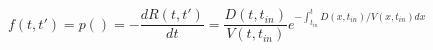 \begin{equation}
f(t,t') = p()= -\frac{dR(t,t')}{dt} = \frac{D(t,t_{in})}{V(t,t_{in})}e^{-\int_{t_{in}}^t D(x,t_{in})/V(x,t_{in}) dx}
\end{equation}